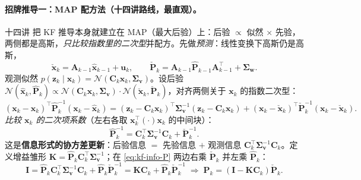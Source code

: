 \paragraph{招牌推导一：MAP 配方法（十四讲路线，最直观）。}\label{par:kf-map-route}
十四讲\cite{gaoxiang2019slam14} 把 KF 推导本身就建立在 MAP（最大后验）上：后验 $\propto$ 似然 $\times$ 先验，两侧都是高斯，\emph{只比较指数里的二次型}并配方。先做\emph{预测}：线性变换下高斯仍是高斯，
\begin{equation}
  \check{\mathbf{x}}_k=\mathbf{A}_{k-1}\hat{\mathbf{x}}_{k-1}+\mathbf{u}_k,\qquad
  \check{\mathbf{P}}_k=\mathbf{A}_{k-1}\hat{\mathbf{P}}_{k-1}\mathbf{A}_{k-1}^\top+\boldsymbol{\Sigma}_{\mathbf{w}}.
  \label{eq:kf-map-predict}
\end{equation}
观测似然 $p(\mathbf{z}_k\mid\mathbf{x}_k)=\mathcal{N}(\mathbf{C}_k\mathbf{x}_k,\boldsymbol{\Sigma}_{\mathbf{v}})$。设后验 $\mathcal{N}(\hat{\mathbf{x}}_k,\hat{\mathbf{P}}_k)\propto\mathcal{N}(\mathbf{C}_k\mathbf{x}_k,\boldsymbol{\Sigma}_{\mathbf{v}})\cdot\mathcal{N}(\check{\mathbf{x}}_k,\check{\mathbf{P}}_k)$，对齐两侧关于 $\mathbf{x}_k$ 的指数二次型：
\begin{equation}
  (\mathbf{x}_k-\hat{\mathbf{x}}_k)^\top\hat{\mathbf{P}}_k^{-1}(\mathbf{x}_k-\hat{\mathbf{x}}_k)
  =(\mathbf{z}_k-\mathbf{C}_k\mathbf{x}_k)^\top\boldsymbol{\Sigma}_{\mathbf{v}}^{-1}(\mathbf{z}_k-\mathbf{C}_k\mathbf{x}_k)
  +(\mathbf{x}_k-\check{\mathbf{x}}_k)^\top\check{\mathbf{P}}_k^{-1}(\mathbf{x}_k-\check{\mathbf{x}}_k).
  \label{eq:kf-quadform}
\end{equation}
\emph{比较 $\mathbf{x}_k$ 的二次项系数}（左右各取 $\mathbf{x}_k^\top(\cdot)\mathbf{x}_k$ 的中间块）：
\begin{equation}
  \hat{\mathbf{P}}_k^{-1}=\mathbf{C}_k^\top\boldsymbol{\Sigma}_{\mathbf{v}}^{-1}\mathbf{C}_k+\check{\mathbf{P}}_k^{-1}.
  \label{eq:kf-info}\label{eq:kf-info-P}
\end{equation}
这是\textbf{信息形式的协方差更新}：后验信息 $=$ 先验信息 $+$ 观测信息 $\mathbf{C}_k^\top\boldsymbol{\Sigma}_{\mathbf{v}}^{-1}\mathbf{C}_k$。定义增益雏形 $\mathbf{K}=\hat{\mathbf{P}}_k\mathbf{C}_k^\top\boldsymbol{\Sigma}_{\mathbf{v}}^{-1}$；在 \cref{eq:kf-info-P} 两边右乘 $\check{\mathbf{P}}_k$ 并左乘 $\hat{\mathbf{P}}_k$：
\begin{equation}
  \mathbf{I}=\hat{\mathbf{P}}_k\mathbf{C}_k^\top\boldsymbol{\Sigma}_{\mathbf{v}}^{-1}\mathbf{C}_k+\hat{\mathbf{P}}_k\check{\mathbf{P}}_k^{-1}
  =\mathbf{K}\mathbf{C}_k+\hat{\mathbf{P}}_k\check{\mathbf{P}}_k^{-1}
  \;\Longrightarrow\;\hat{\mathbf{P}}_k=(\mathbf{I}-\mathbf{K}\mathbf{C}_k)\check{\mathbf{P}}_k.
  \label{eq:kf-Phat}
\end{equation}
